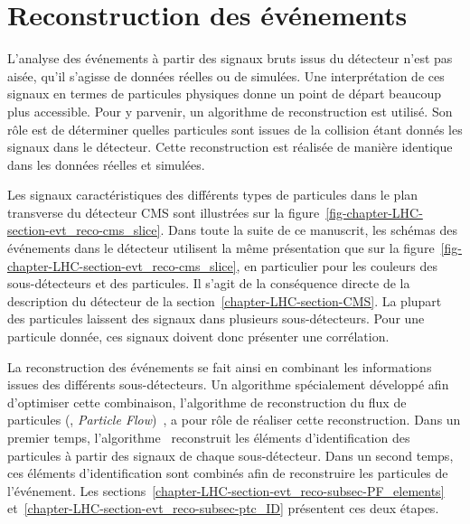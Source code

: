 \section{Reconstruction des événements}\label{chapter-LHC-section-evt_reco}
L'analyse des événements à partir des signaux bruts issus du détecteur n'est pas aisée, qu'il s'agisse de données réelles ou de simulées.
Une interprétation de ces signaux en termes de particules physiques donne un point de départ beaucoup plus accessible.
Pour y parvenir, un algorithme de reconstruction est utilisé.
Son rôle est de déterminer quelles particules sont issues de la collision étant donnés les signaux dans le détecteur.
Cette reconstruction est réalisée de manière identique dans les données réelles et simulées.
\par
Les signaux caractéristiques des différents types de particules dans le plan transverse du détecteur CMS sont illustrées sur la figure~\ref{fig-chapter-LHC-section-evt_reco-cms_slice}.
Dans toute la suite de ce manuscrit, les schémas des événements dans le détecteur utilisent la même présentation que sur la figure~\ref{fig-chapter-LHC-section-evt_reco-cms_slice}, en particulier pour les couleurs des sous-détecteurs et des particules.
Il s'agit de la conséquence directe de la description du détecteur de la section~\ref{chapter-LHC-section-CMS}.
La plupart des particules laissent des signaux dans plusieurs sous-détecteurs.
Pour une particule donnée, ces signaux doivent donc présenter une corrélation.
\par La reconstruction des événements se fait ainsi en combinant les informations issues des différents sous-détecteurs.
Un algorithme spécialement développé afin d'optimiser cette combinaison, l'algorithme de reconstruction du flux de particules (\PF, \emph{Particle Flow})~\cite{particle-flow,Dordevic_particle_flow}, a pour rôle de réaliser cette reconstruction.
Dans un premier temps, l'algorithme \PF\ reconstruit les éléments d'identification des particules à partir des signaux de chaque sous-détecteur.
Dans un second temps, ces éléments d'identification sont combinés afin de reconstruire les particules de l'événement.
Les sections~\ref{chapter-LHC-section-evt_reco-subsec-PF_elements} et~\ref{chapter-LHC-section-evt_reco-subsec-ptc_ID} présentent ces deux étapes.
